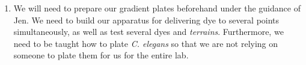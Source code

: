 \begin{enumerate}
\item We will need to prepare our gradient plates beforehand under the guidance of Jen. We need to build our apparatus for delivering dye to several points simultaneously, as well as test several dyes and \emph{terrains}. Furthermore, we need to be taught how to plate \textit{C. elegans} so that we are not relying on someone to plate them for us for the entire lab. 
\end{enumerate}

